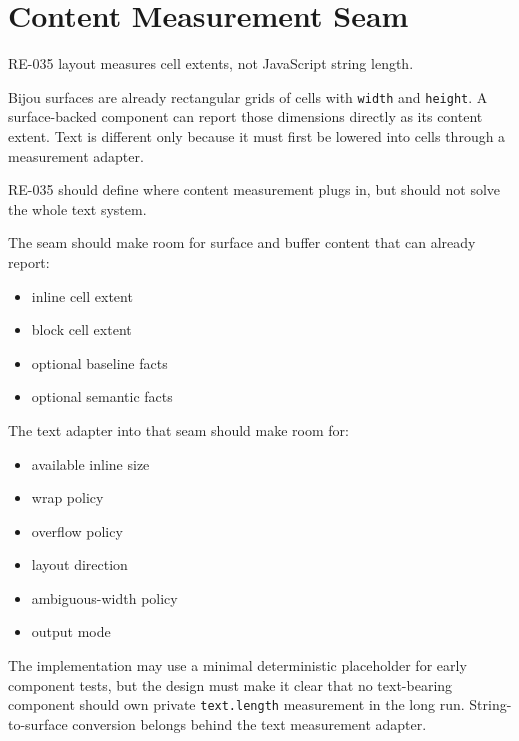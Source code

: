 \section{Content Measurement Seam}\label{record-163-content-measurement-seam}

RE-035 layout measures cell extents, not JavaScript string length.

Bijou surfaces are already rectangular grids of cells with \texttt{w\allowbreak{}i\allowbreak{}d\allowbreak{}t\allowbreak{}h} and \texttt{h\allowbreak{}e\allowbreak{}i\allowbreak{}g\allowbreak{}h\allowbreak{}t}. A surface-backed component can report those dimensions directly as its content extent. Text is different only because it must first be lowered into cells through a measurement adapter.

RE-035 should define where content measurement plugs in, but should not solve the whole text system.

The seam should make room for surface and buffer content that can already report:

\begin{itemize}
\tightlist
\item
  inline cell extent
\item
  block cell extent
\item
  optional baseline facts
\item
  optional semantic facts
\end{itemize}

The text adapter into that seam should make room for:

\begin{itemize}
\tightlist
\item
  available inline size
\item
  wrap policy
\item
  overflow policy
\item
  layout direction
\item
  ambiguous-width policy
\item
  output mode
\end{itemize}

The implementation may use a minimal deterministic placeholder for early component tests, but the design must make it clear that no text-bearing component should own private \texttt{t\allowbreak{}e\allowbreak{}x\allowbreak{}t\allowbreak{}.\allowbreak{}l\allowbreak{}e\allowbreak{}n\allowbreak{}g\allowbreak{}t\allowbreak{}h} measurement in the long run. String-to-surface conversion belongs behind the text measurement adapter.


